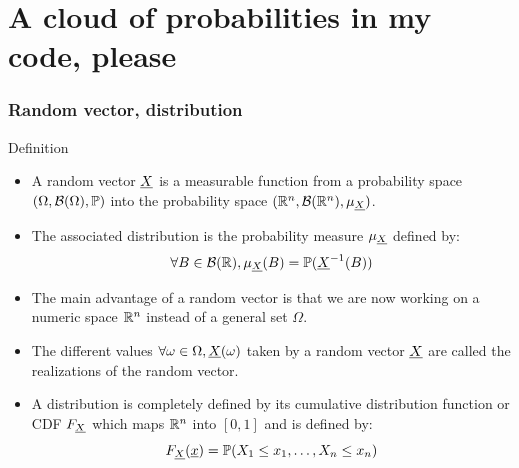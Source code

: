 \documentclass[8pt]{beamer}
\begin{document}
\section[A cloud of probabilities in my code, please]{A cloud of probabilities in my code, please}
\begin{frame}
  \frametitle{Random vector, distribution}
  \begin{block}{Definition}
    \begin{itemize}
    \item A \alert{random vector $\vect{X}$} is a measurable function from a probability space $(\Omega, \mathcal{B}(\Omega), \P)$ into the probability space $(\R^n,\mathcal{B}(\R^n), \mu_{\vect{X}})$. 
    \item The associated \alert{distribution} is the probability measure $\mu_{\vect{X}}$ defined by:
      \begin{equation}
        \forall B\in\mathcal{B}(\R), \mu_{\vect{X}}(B)=\P(\vect{X}^{-1}(B))
      \end{equation}
    \item The \alert{main advantage} of a random vector is that we are now working on a \alert{numeric space $\R^n$} instead of a general set $\Omega$.
    \item The different values $\forall \omega\in\Omega, \vect{X}(\omega)$ taken by a random vector $\vect{X}$ are called the \alert{realizations} of the random vector.
    \item A distribution is completely defined by its \alert{cumulative distribution function or CDF} $F_{\vect{X}}$ which maps $\R^n$ into $[0,1]$ and is defined by:
      \begin{equation}
        F_{\vect{X}}(\vect{x})=\P(X_1\leq x_1,\dots,X_n\leq x_n)
      \end{equation}
    \end{itemize}
  \end{block}
\end{frame}
\end{document}
